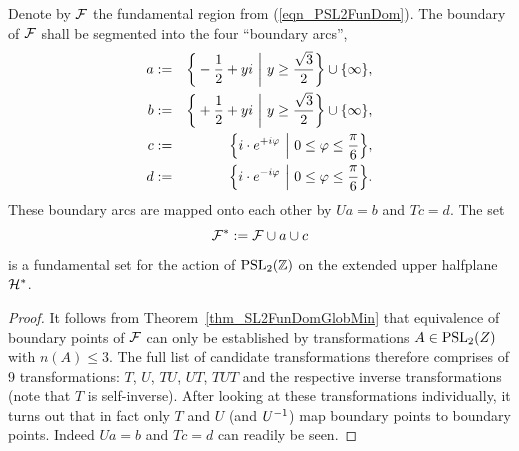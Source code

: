 \begin{theorem}
\label{thm_PSL2FunSet}
Denote by $\mathcal{F}$ the fundamental region from (\ref{eqn_PSL2FunDom}). The boundary of $\mathcal{F}$ shall be segmented into the four ``boundary arcs'',
\begin{eqnarray*}
a &:=& \bigg\{ -\frac{1}{2} + y i \ \bigg| \ y \ge \frac{\sqrt{3}}{2} \bigg\} \cup \{\infty\},\\
b &:=& \bigg\{ +\frac{1}{2} + y i \ \bigg| \ y \ge \frac{\sqrt{3}}{2} \bigg\} \cup \{\infty\},\\
c &:=& \Big\{ i \cdot e^{+i \varphi} \ \Big| \ 0 \le \varphi \le \frac{\pi}{6} \Big\},\\
d &:=& \Big\{ i \cdot e^{-i \varphi} \ \Big| \ 0 \le \varphi \le \frac{\pi}{6} \Big\}.
\end{eqnarray*}
These boundary arcs are mapped onto each other by $Ua = b$ and $Tc = d$. The set
\begin{equation}
\label{eqn_PSL2FunSet}
\mathcal{F}^\ast := \mathcal{F} \cup a \cup c
\end{equation}
is a fundamental set for the action of $\operatorname{PSL}_{2}(\mathbb{Z})$ on the extended upper halfplane $\mathcal{H}^\ast$.
\end{theorem}
\begin{proof}
It follows from Theorem~\ref{thm_SL2FunDomGlobMin} that equivalence of boundary points of $\mathcal{F}$ can only be established by transformations $A \in \operatorname{PSL}_{2}(Z)$ with $n(A) \le 3$. The full list of candidate transformations therefore comprises of 9 transformations: $T$, $U$, $TU$, $UT$, $TUT$ and the respective inverse transformations (note that $T$ is self-inverse). After looking at these transformations individually, it turns out that in fact only $T$ and $U$ (and ${U}^{-1}$) map boundary points to boundary points. Indeed $Ua = b$ and $Tc = d$ can readily be seen.
\end{proof}

